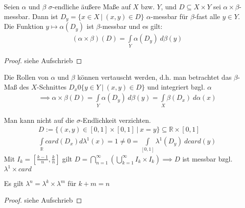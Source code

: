   \begin{theorem}
    Seien $\alpha$ und $\beta$ $\sigma$-endliche äußere Maße auf $X$ bzw. $Y$, und $D \subseteq X \times Y$ sei $\alpha \times \beta$-messbar. Dann ist $D_y = \{x \in X \ | \ (x,y) \in D\}$ $\alpha$-messbar für $\beta$-fast alle $y \in Y$. Die Funktion $y \mapsto \alpha(D_y)$ ist $\beta$-messbar und es gilt:
    \begin{align*}
      (\alpha \times \beta)(D) = \int\limits_Y \alpha(D_y) \ d\beta(y)
    \end{align*}
  \end{theorem}
  \begin{proof}
    siehe Aufschrieb
  \end{proof}

  \begin{remark}
    Die Rollen von $\alpha$ und $\beta$ können vertauscht werden, d.h. man betrachtet das $\beta$-Maß des $X$-Schnittes $D_x 0 \{y \in Y \ | \ (x,y) \in D\}$ und integriert bzgl. $\alpha$
    \begin{align*}
      \implies \alpha \times \beta (D) = \int\limits_Y \alpha(D_y) \ d\beta(y) = \int\limits_X \beta(D_x) \ d\alpha(x)
    \end{align*}
  \end{remark}

  \begin{example}
    Man kann nicht auf die $\sigma$-Endlichkeit verzichten.
    \begin{align*}
      D := \{(x,y) \in [0,1] \times [0,1] \ | \ x=y\} \subseteq \mathbb{R} \times [0,1]\\
      \int\limits_{\mathbb{R}} card(D_x) d\lambda^1(x) = 1 \neq 0 = \int\limits_{[0,1]} \lambda^1(D_y) \ d card(y)
    \end{align*}
    Mit $I_k = [\frac{k-1}{n}, \frac{k}{n}]$ gilt $D = \bigcap\limits_{n=1}^{\infty}( \bigcup\limits_{k=1}^{\infty} I_k \times I_k) \implies D$ ist messbar bzgl. $\lambda^1 \times card$
  \end{example}

  \newpage
  \begin{lemma}
    Es gilt $\lambda^n = \lambda^k \times \lambda^m$ für $k + m = n$
  \end{lemma}
  \begin{proof}
    siehe Aufschrieb
  \end{proof}

